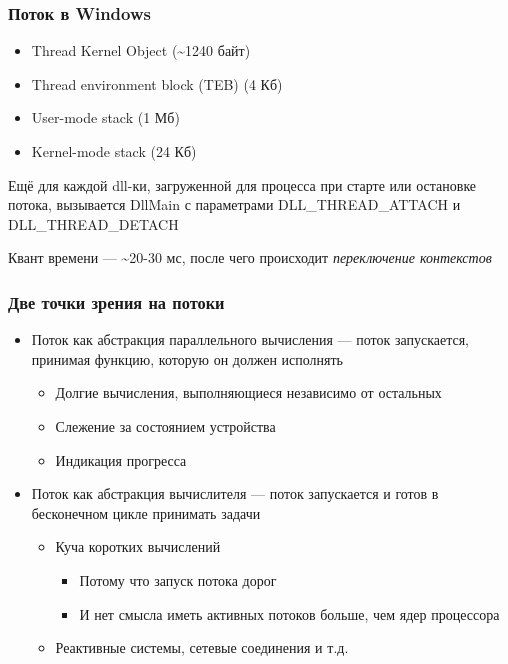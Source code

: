 \documentclass[xetex,mathserif,serif]{beamer}
\begin{document}
	\begin{frame}
		\frametitle{Поток в Windows}
		\begin{itemize}
			\item Thread Kernel Object (\textasciitilde1240 байт)
			\item Thread environment block (TEB) (4 Кб)
			\item User-mode stack (1 Мб)
			\item Kernel-mode stack (24 Кб)
		\end{itemize}

		Ещё для каждой dll-ки, загруженной для процесса при старте или остановке потока, вызывается DllMain с параметрами DLL\_THREAD\_ATTACH и DLL\_THREAD\_DETACH

		\vspace{3mm}
		Квант времени --- \textasciitilde20-30 мс, после чего происходит \textit{переключение контекстов}
	\end{frame}

	\begin{frame}
		\frametitle{Две точки зрения на потоки}
		\begin{itemize}
			\item Поток как абстракция параллельного вычисления --- поток запускается, принимая функцию, которую он должен исполнять
			\begin{itemize}
				\item Долгие вычисления, выполняющиеся независимо от остальных
				\item Слежение за состоянием устройства
				\item Индикация прогресса
			\end{itemize}
			\item Поток как абстракция вычислителя --- поток запускается и готов в бесконечном цикле принимать задачи
			\begin{itemize}
				\item Куча коротких вычислений
				\begin{itemize}
					\item Потому что запуск потока дорог
					\item И нет смысла иметь активных потоков больше, чем ядер процессора
				\end{itemize}
				\item Реактивные системы, сетевые соединения и т.д.
			\end{itemize}
		\end{itemize}
	\end{frame}
\end{document}
